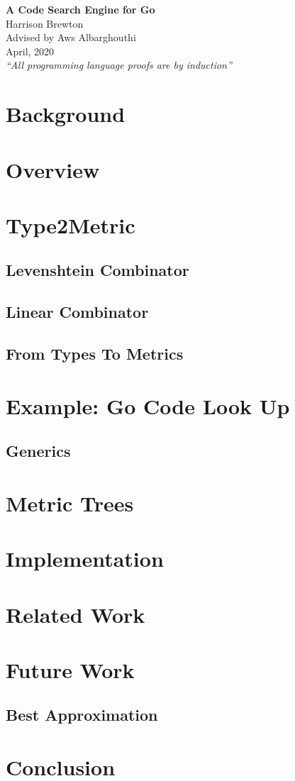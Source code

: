 \documentclass{article}
\begin{document}
{\centering \Huge \textbf{A Code Search Engine for Go} \\ 
\vspace{0.5cm}
\Large
Harrison Brewton \\
Advised by Aws Albarghouthi \\ 
April, 2020 \\
\normalsize
\vspace{0.1cm} \textit{``All programming language proofs are by induction''} \vspace{0.1cm} \par
}
\section{Background}
\section{Overview}
\section{Type2Metric}
\subsection{Levenshtein Combinator}

\subsection{Linear Combinator}

\subsection{From Types To Metrics}

\section{Example: Go Code Look Up}
\subsection{Generics}
\section{Metric Trees}
\section{Implementation}
\section{Related Work}
\section{Future Work}
\subsection{Best Approximation}
\section{Conclusion}



\end{document}
